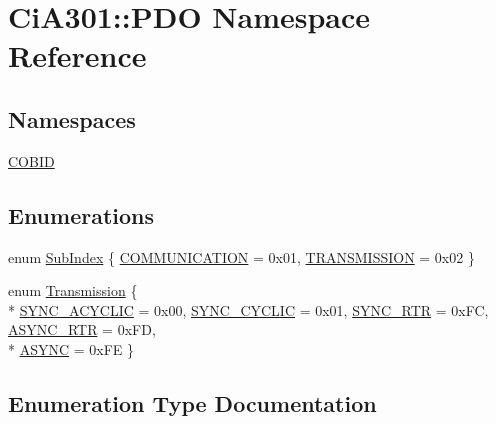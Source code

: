 \hypertarget{namespace_ci_a301_1_1_p_d_o}{}\section{Ci\+A301\+:\+:P\+D\+O Namespace Reference}
\label{namespace_ci_a301_1_1_p_d_o}
\subsection*{Namespaces}
\begin{DoxyCompactItemize}
\item 
 \hyperlink{namespace_ci_a301_1_1_p_d_o_1_1_c_o_b_i_d}{C\+O\+B\+I\+D}
\end{DoxyCompactItemize}
\subsection*{Enumerations}
\begin{DoxyCompactItemize}
\item 
enum \hyperlink{namespace_ci_a301_1_1_p_d_o_a611f28b9f491e717bec59de2e853bc77}{Sub\+Index} \{ \hyperlink{namespace_ci_a301_1_1_p_d_o_a611f28b9f491e717bec59de2e853bc77a2f14df6388655cf20ed91bad641d4489}{C\+O\+M\+M\+U\+N\+I\+C\+A\+T\+I\+O\+N} = 0x01, 
\hyperlink{namespace_ci_a301_1_1_p_d_o_a611f28b9f491e717bec59de2e853bc77a4a75a6a0d260911a6bd62259770791fb}{T\+R\+A\+N\+S\+M\+I\+S\+S\+I\+O\+N} = 0x02
 \}
\item 
enum \hyperlink{namespace_ci_a301_1_1_p_d_o_a6c7a5941fe4f869dd1703fb7ce7f6549}{Transmission} \{ \\*
\hyperlink{namespace_ci_a301_1_1_p_d_o_a6c7a5941fe4f869dd1703fb7ce7f6549a6094aae3d88e3bafa764e0315b666028}{S\+Y\+N\+C\+\_\+\+A\+C\+Y\+C\+L\+I\+C} = 0x00, 
\hyperlink{namespace_ci_a301_1_1_p_d_o_a6c7a5941fe4f869dd1703fb7ce7f6549aba6ca4425aa49a7fe5fb995e25f3225f}{S\+Y\+N\+C\+\_\+\+C\+Y\+C\+L\+I\+C} = 0x01, 
\hyperlink{namespace_ci_a301_1_1_p_d_o_a6c7a5941fe4f869dd1703fb7ce7f6549a7fb8e0edb92cfb2d258019ef6aaccebc}{S\+Y\+N\+C\+\_\+\+R\+T\+R} = 0x\+F\+C, 
\hyperlink{namespace_ci_a301_1_1_p_d_o_a6c7a5941fe4f869dd1703fb7ce7f6549a39d10f2cb5ed95e2f4b1e19715d45db2}{A\+S\+Y\+N\+C\+\_\+\+R\+T\+R} = 0x\+F\+D, 
\\*
\hyperlink{namespace_ci_a301_1_1_p_d_o_a6c7a5941fe4f869dd1703fb7ce7f6549a580da8a967044c37a27716b67b8b1188}{A\+S\+Y\+N\+C} = 0x\+F\+E
 \}
\end{DoxyCompactItemize}


\subsection{Enumeration Type Documentation}
\hypertarget{namespace_ci_a301_1_1_p_d_o_a611f28b9f491e717bec59de2e853bc77}{}
